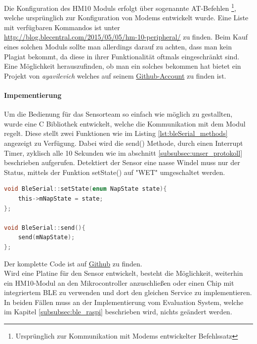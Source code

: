 Die Konfiguration des HM10 Moduls erfolgt über sogenannte AT-Befehlen \footnote{Ursprünglich zur Kommunikation mit Modems entwickelter Befehlssatz}, welche ursprünglich zur Konfiguration von Modems entwickelt wurde. Eine Liste mit verfügbaren Kommandos ist unter \url{http://blog.blecentral.com/2015/05/05/hm-10-peripheral/} zu finden. Beim Kauf eines solchen Moduls sollte man allerdings darauf zu achten, dass man kein Plagiat bekommt, da diese in ihrer Funktionalität oftmals eingeschränkt sind. Eine Möglichkeit herauszufinden, ob man ein solches bekommen hat bietet ein Projekt von \textit{ayavilevich} welches auf seinem \href{https://github.com/ayavilevich/arduino-ble-ident-n-set}{Github-Account} zu finden ist.

\paragraph{Impementierung}
Um die Bedienung für das Sensorteam so einfach wie möglich zu gestallten, wurde eine C Bibliothek entwickelt, welche die Kommunikation mit dem Modul regelt. Diese stellt zwei Funktionen wie im Listing \ref{lst:bleSerial_methods} angezeigt zu Verfügung. Dabei wird die send() Methode, durch einen Interrupt Timer, zyklisch alle 10 Sekunden wie im abschnitt \ref{subsubsec:unser_protokoll} beschrieben aufgerufen. Detektiert der Sensor eine nasse Windel muss nur der Status, mittels der Funktion setState() auf "WET" umgeschaltet werden.

\begin{lstlisting}[language=C, caption=send und setState Methoden aus der BleSerial bibliothek, label=lst:bleSerial_methods ]
void BleSerial::setState(enum NapState state){
	this->mNapState = state;
};

void BleSerial::send(){
	send(mNapState);
};
\end{lstlisting}

Der komplette Code ist auf \href{https://github.com/jomaway/poop-face-detection_sensor/tree/master/arduino/libraries/BleSerial}{Github}  zu finden. \\

Wird eine Platine für den Sensor entwickelt, besteht die Möglichkeit, weiterhin ein HM10-Modul an den Mikrocontroller anzuschließen oder einen Chip mit integriertem BLE zu verwenden und dort den gleichen Service zu implementieren. In beiden Fällen muss an der Implementierung vom Evaluation System, welche im Kapitel \ref{subsubsec:ble_raspi} beschrieben wird, nichts geändert werden.

